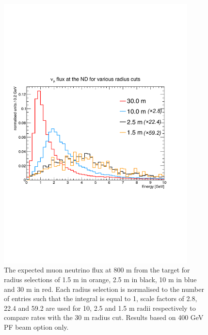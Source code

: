 \begin{figure}[htbp]
\begin{center}
 	\includegraphics[width=100mm]{Chapter3/figures/400GeV_PF_numuRadiusCuts.pdf}
      \caption{The expected muon neutrino flux at 800 m from the target for radius selections of 1.5 m in orange, 2.5 m in black, 10 m in blue and 30 m in red. Each radius selection is normalised to the number of entries such that the integral is equal to 1, scale factors of 2.8, 22.4 and 59.2 are used for 10, 2.5 and 1.5 m radii respectively to compare rates with the 30 m radius cut. Results based on 400 GeV PF beam option only.}
    \label{fig:numuFluxRadius}
\end{center}
\end{figure}

